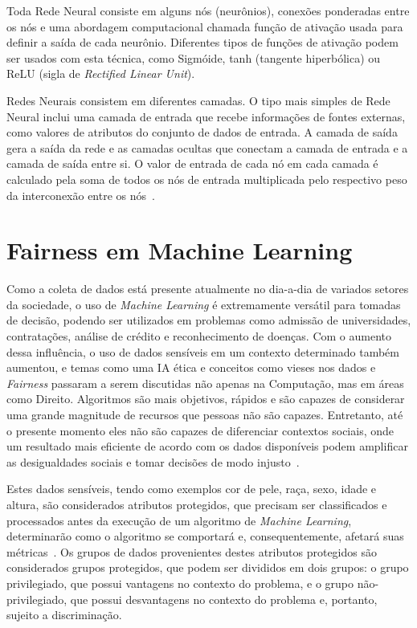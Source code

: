 \documentclass[portugues]{ic-tese}
\begin{document}
Toda Rede Neural consiste em alguns nós (neurônios), conexões ponderadas entre os nós e uma abordagem computacional chamada função de ativação usada para definir a saída de cada neurônio. Diferentes tipos de funções de ativação podem ser usados com esta técnica, como Sigmóide, tanh (tangente hiperbólica) ou ReLU (sigla de \textit{Rectified Linear Unit}).

Redes Neurais consistem em diferentes camadas. O tipo mais simples de Rede Neural inclui uma camada de entrada que recebe informações de fontes externas, como valores de atributos do conjunto de dados de entrada. A camada de saída gera a saída da rede e as camadas ocultas que conectam a camada de entrada e a camada de saída entre si. O valor de entrada de cada nó em cada camada é calculado pela soma de todos os nós de entrada multiplicada pelo respectivo peso da interconexão entre os nós~\citep{Erb_1993}.

\section{Fairness em Machine Learning}

Como a coleta de dados está presente atualmente no dia-a-dia de variados setores da sociedade, o uso de \textit{Machine Learning} é extremamente versátil para tomadas de decisão, podendo ser utilizados em problemas como admissão de universidades, contratações, análise de crédito e reconhecimento de doenças. Com o aumento dessa influência, o uso de dados sensíveis em um contexto determinado também aumentou, e temas como uma IA ética e conceitos como vieses nos dados e \textit{Fairness} passaram a serem discutidas não apenas na Computação, mas em áreas como Direito. Algoritmos são mais objetivos, rápidos e são capazes de considerar uma grande magnitude de recursos que pessoas não são capazes. Entretanto, até o presente momento eles não são capazes de diferenciar contextos sociais, onde um resultado mais eficiente de acordo com os dados disponíveis podem amplificar as desigualdades sociais e tomar decisões de modo injusto~\citep{Mehrabi_2021}. 

Estes dados sensíveis, tendo como exemplos cor de pele, raça, sexo, idade e altura, são considerados atributos protegidos, que precisam ser classificados e processados antes da execução de um algoritmo de \textit{Machine Learning}, determinarão como o algoritmo se comportará e, consequentemente, afetará suas métricas~\citep{Mougan_2022}. Os grupos de dados provenientes destes atributos protegidos são considerados grupos protegidos, que podem ser divididos em dois grupos: o grupo privilegiado, que possui vantagens no contexto do problema, e o grupo não-privilegiado, que possui desvantagens no contexto do problema e, portanto, sujeito a discriminação.
\end{document}
